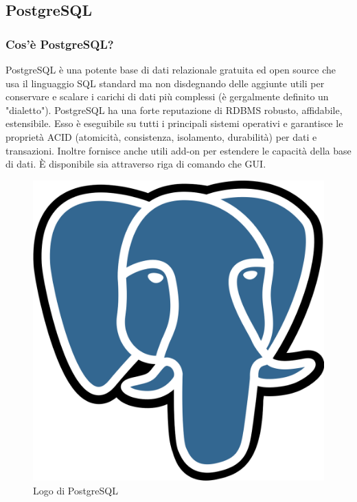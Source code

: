         \subsection{PostgreSQL}
            \subsubsection{Cos'è PostgreSQL? \cite{PostgreSQL1}}
                PostgreSQL è una potente base di dati relazionale gratuita ed open source che usa il linguaggio SQL standard ma non disdegnando delle aggiunte utili per conservare e scalare i carichi di dati più complessi (è gergalmente definito un "dialetto"). PostgreSQL ha una forte reputazione di RDBMS robusto, affidabile, estensibile. Esso è eseguibile su tutti i principali sistemi operativi e garantisce le proprietà ACID (atomicità, consistenza, isolamento, durabilità) per dati e transazioni. Inoltre fornisce anche utili add-on per estendere le capacità della base di dati. È disponibile sia attraverso riga di comando che GUI.
            \begin{figure}[htbp!]
                \centering
                \includegraphics[width=0.2\linewidth]{Immagini/System Design/PostgreSQL.png}
                \caption{Logo di PostgreSQL}
            \end{figure}
